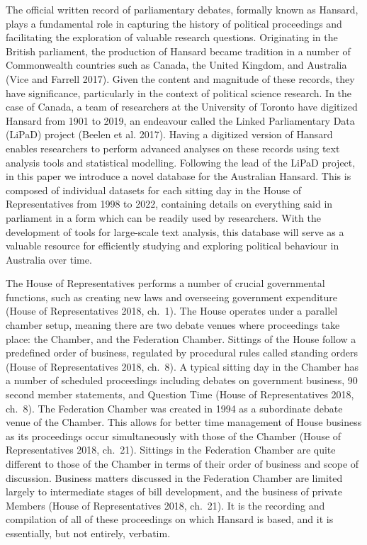 \documentclass[
  letterpaper,
  DIV=11,
  numbers=noendperiod]{scrartcl}
\begin{document}
The official written record of parliamentary debates, formally known as
Hansard, plays a fundamental role in capturing the history of political
proceedings and facilitating the exploration of valuable research
questions. Originating in the British parliament, the production of
Hansard became tradition in a number of Commonwealth countries such as
Canada, the United Kingdom, and Australia (Vice and Farrell 2017). Given
the content and magnitude of these records, they have significance,
particularly in the context of political science research. In the case
of Canada, a team of researchers at the University of Toronto have
digitized Hansard from 1901 to 2019, an endeavour called the Linked
Parliamentary Data (LiPaD) project (Beelen et al. 2017). Having a
digitized version of Hansard enables researchers to perform advanced
analyses on these records using text analysis tools and statistical
modelling. Following the lead of the LiPaD project, in this paper we
introduce a novel database for the Australian Hansard. This is composed
of individual datasets for each sitting day in the House of
Representatives from 1998 to 2022, containing details on everything said
in parliament in a form which can be readily used by researchers. With
the development of tools for large-scale text analysis, this database
will serve as a valuable resource for efficiently studying and exploring
political behaviour in Australia over time.

The House of Representatives performs a number of crucial governmental
functions, such as creating new laws and overseeing government
expenditure (House of Representatives 2018, ch.~1). The House operates
under a parallel chamber setup, meaning there are two debate venues
where proceedings take place: the Chamber, and the Federation Chamber.
Sittings of the House follow a predefined order of business, regulated
by procedural rules called standing orders (House of Representatives
2018, ch.~8). A typical sitting day in the Chamber has a number of
scheduled proceedings including debates on government business, 90
second member statements, and Question Time (House of Representatives
2018, ch.~8). The Federation Chamber was created in 1994 as a
subordinate debate venue of the Chamber. This allows for better time
management of House business as its proceedings occur simultaneously
with those of the Chamber (House of Representatives 2018, ch.~21).
Sittings in the Federation Chamber are quite different to those of the
Chamber in terms of their order of business and scope of discussion.
Business matters discussed in the Federation Chamber are limited largely
to intermediate stages of bill development, and the business of private
Members (House of Representatives 2018, ch.~21). It is the recording and
compilation of all of these proceedings on which Hansard is based, and
it is essentially, but not entirely, verbatim.
\end{document}
